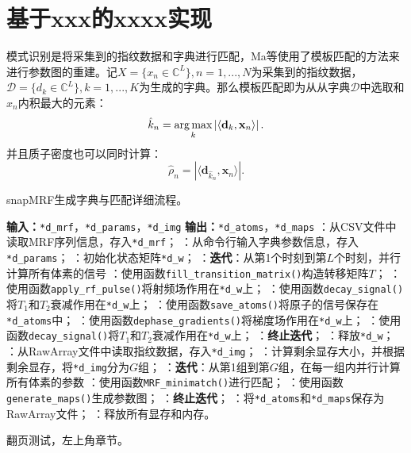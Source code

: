 \chapter{基于xxx的xxxx实现}
\label{chap:chap4}
模式识别是将采集到的指纹数据和字典进行匹配，Ma等\cite{mrf}使用了模板匹配的方法来进行参数图的重建。记$X=\{x_n\in \mathbb{C}^L\}, n=1,...,N$为采集到的指纹数据，$\mathcal{D}=\{d_k\in \mathbb{C}^L\},k=1,...,K$为生成的字典。那么模板匹配即为从从字典$\mathcal{D}$中选取和$x_n$内积最大的元素：
	\begin{equation}
	\hat{k}_n = \operatorname*{arg\,max}_k \left|\left\langle \mathbf{d}_k,\mathbf{x}_n \right\rangle \right|.
	\end{equation}
并且质子密度也可以同时计算：
	\begin{equation}
	\hat{\rho}_n=\left|\langle \mathbf{d}_{\hat{k}_n},\mathbf{x}_n \rangle\right|.
	\end{equation}

\begin{algorithm}
	\caption{snapMRF生成字典与匹配详细流程。}
	\label{alg:snapMRF}
	\begin{algorithmic}
		\INDSTATE[-1.25] \textbf{输入：}\texttt{*d\_mrf}，\texttt{*d\_params}，\texttt{*d\_img}
		\INDSTATE[-1.25] \textbf{输出：}\texttt{*d\_atoms}，\texttt{*d\_maps}
		：从CSV文件中读取MRF序列信息，存入\texttt{*d\_mrf}；
		：从命令行输入字典参数信息，存入\texttt{*d\_params}；
		：初始化状态矩阵\texttt{*d\_w}；
		：\textbf{迭代}：从第1个时刻到第$L$个时刻，并行计算所有体素的信号
		：\qquad 使用函数\texttt{fill\_transition\_matrix()}构造转移矩阵$T$；
		：\qquad 使用函数\texttt{apply\_rf\_pulse()}将射频场作用在\texttt{*d\_w}上；
		：\qquad 使用函数\texttt{decay\_signal()}将$T_1$和$T_2$衰减作用在\texttt{*d\_w}上；
		：\qquad 使用函数\texttt{save\_atoms()}将原子的信号保存在\texttt{*d\_atoms}中；
		：\qquad 使用函数\texttt{dephase\_gradients()}将梯度场作用在\texttt{*d\_w}上；
		：\qquad 使用函数\texttt{decay\_signal()}将$T_1$和$T_2$衰减作用在\texttt{*d\_w}上；
		：\textbf{终止迭代}；
		：释放\texttt{*d\_w}；
		：从RawArray文件中读取指纹数据，存入\texttt{*d\_img}；
		：计算剩余显存大小，并根据剩余显存，将\texttt{*d\_img}分为$G$组；
		：\textbf{迭代}：从第1组到第$G$组，在每一组内并行计算所有体素的参数
		：\qquad 使用函数\texttt{MRF\_minimatch()}进行匹配；
		：\qquad 使用函数\texttt{generate\_maps()}生成参数图；
		：\textbf{终止迭代}；
		：将\texttt{*d\_atoms}和\texttt{*d\_maps}保存为RawArray文件；
		：释放所有显存和内存。
	\end{algorithmic}
\end{algorithm}

\newpage
翻页测试，左上角章节。





